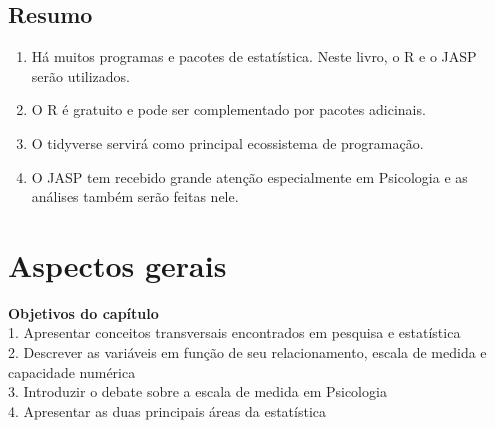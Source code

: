 \documentclass[
]{book}
\providecommand{\tightlist}{%
  \setlength{\itemsep}{0pt}\setlength{\parskip}{0pt}}
\newenvironment{objectives}{
  \definecolor{shadecolor}{rgb}{0, 0, 0}  %
  \color{white}
  \begin{shaded}}
 {\end{shaded}}
\begin{document}
\hypertarget{resumo}{%
\section{Resumo}\label{resumo}}

\begin{enumerate}
\def\labelenumi{\arabic{enumi}.}
\tightlist
\item
  Há muitos programas e pacotes de estatística. Neste livro, o R e o JASP serão utilizados.\\
\item
  O R é gratuito e pode ser complementado por pacotes adicinais.\\
\item
  O tidyverse servirá como principal ecossistema de programação.\\
\item
  O JASP tem recebido grande atenção especialmente em Psicologia e as análises também serão feitas nele.\\
\end{enumerate}

\hypertarget{aspectos-gerais}{%
\chapter{Aspectos gerais}\label{aspectos-gerais}}

\begin{objectives}
\textbf{Objetivos do capítulo}\\
1. Apresentar conceitos transversais encontrados em pesquisa e estatística\\
2. Descrever as variáveis em função de seu relacionamento, escala de medida e capacidade numérica\\
3. Introduzir o debate sobre a escala de medida em Psicologia\\
4. Apresentar as duas principais áreas da estatística

\end{objectives}
\end{document}
